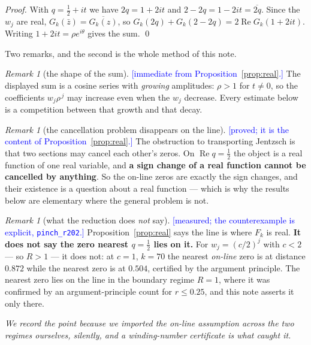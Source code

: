 \documentclass[11pt,a4paper]{article}
\theoremstyle{plain}
\theoremstyle{definition}
\theoremstyle{remark}
\newtheorem{remark}[theorem]{Remark}
\newcommand{\STATUS}[1]{\textcolor{blue}{\textsf{[#1]}}}
\begin{document}
\begin{proof}
With $q=\tfrac12+it$ we have $2q=1+2it$ and $2-2q=1-2it=\overline{2q}$. Since the $w_j$
are real, $G_k(\bar z)=\overline{G_k(z)}$, so $G_k(2q)+G_k(2-2q)=2\operatorname{Re}
G_k(1+2it)$. Writing $1+2it=\rho e^{i\theta}$ gives the sum. \qed
\end{proof}

Two remarks, and the second is the whole method of this note.

\begin{remark}[the shape of the sum]\label{rem:shape}
\STATUS{immediate from Proposition~\ref{prop:real}.}
The displayed sum is a cosine series with \emph{growing} amplitudes: $\rho>1$ for
$t\ne0$, so the coefficients $w_j\rho^{\,j}$ may increase even when the $w_j$ decrease.
Every estimate below is a competition between that growth and that decay.
\end{remark}

\begin{remark}[the cancellation problem disappears on the line]\label{rem:nocancel}
\STATUS{proved; it is the content of Proposition~\ref{prop:real}.}
The obstruction to transporting Jentzsch is that two sections may cancel each other's
zeros. On $\operatorname{Re}q=\tfrac12$ the object is a real function of one real
variable, and \textbf{a sign change of a real function cannot be cancelled by anything}.
So the on-line zeros are exactly the sign changes, and their existence is a question
about a real function --- which is why the results below are elementary where the
general problem is not.
\end{remark}

\begin{remark}[what the reduction does \emph{not} say]\label{rem:notnearest}
\STATUS{measured; the counterexample is explicit, \texttt{pinch\_r202}.}
Proposition~\ref{prop:real} says the line is where $F_k$ is real. \textbf{It does not say
the zero nearest $q=\tfrac12$ lies on it.} For $w_j=(c/2)^{j}$ with $c<2$ --- so $R>1$
--- it does not: at $c=1$, $k=70$ the nearest \emph{on-line} zero is at distance
$0.872$ while the nearest zero is at $0.504$, certified by the argument principle. The
nearest zero lies on the line in the boundary regime $R=1$, where it was confirmed by an
argument-principle count for $r\le0.25$, and this note asserts it only there.

\emph{We record the point because we imported the on-line assumption across the two
regimes ourselves, silently, and a winding-number certificate is what caught it.}
\end{remark}
\end{document}

